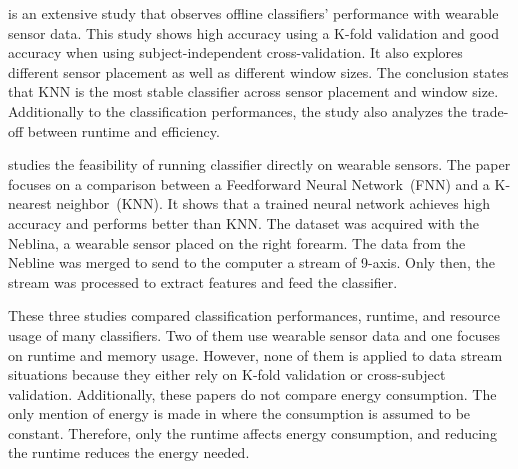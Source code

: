 \cite{Janidarmian_2017} is an extensive study that
observes offline classifiers' performance with
wearable sensor data. This study shows high
accuracy using a K-fold validation and good
accuracy when using subject-independent
cross-validation. It also explores different
sensor placement as well as different window
sizes. The conclusion states that KNN is the most
stable classifier across sensor placement and
window size. Additionally to the classification
performances, the study also analyzes the
trade-off between runtime and efficiency.

\cite{omid_2019} studies the feasibility of
running classifier directly on wearable sensors.
The paper focuses on a comparison between a
Feedforward Neural Network~(FNN) and a K-nearest
neighbor~(KNN). It shows that a trained neural
network achieves high accuracy and performs better
than KNN. The dataset was acquired with the
Neblina, a wearable sensor placed on the right
forearm. The data from the Nebline was merged to
send to the computer a stream of 9-axis. Only
then, the stream was processed to extract features
and feed the classifier.

These three studies compared classification
performances, runtime, and resource usage of many
classifiers. Two of them use wearable sensor data
and one focuses on runtime and memory usage.
However, none of them is applied to data stream
situations because they either rely on K-fold
validation or cross-subject validation.
Additionally, these papers do not compare energy
consumption. The only mention of energy is made in
\cite{omid_2019} where the consumption is assumed to be
constant. Therefore, only the runtime affects 
energy consumption, and reducing the runtime
reduces the energy needed.


